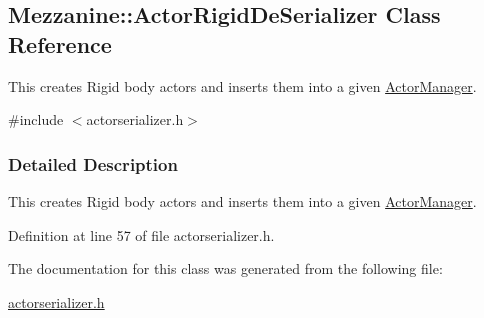 \hypertarget{classMezzanine_1_1ActorRigidDeSerializer}{
\subsection{Mezzanine::ActorRigidDeSerializer Class Reference}
\label{classMezzanine_1_1ActorRigidDeSerializer}
}


This creates Rigid body actors and inserts them into a given \hyperlink{classMezzanine_1_1ActorManager}{ActorManager}.  




{\ttfamily \#include $<$actorserializer.h$>$}



\subsubsection{Detailed Description}
This creates Rigid body actors and inserts them into a given \hyperlink{classMezzanine_1_1ActorManager}{ActorManager}. 

Definition at line 57 of file actorserializer.h.



The documentation for this class was generated from the following file:\begin{DoxyCompactItemize}
\item 
\hyperlink{actorserializer_8h}{actorserializer.h}\end{DoxyCompactItemize}
